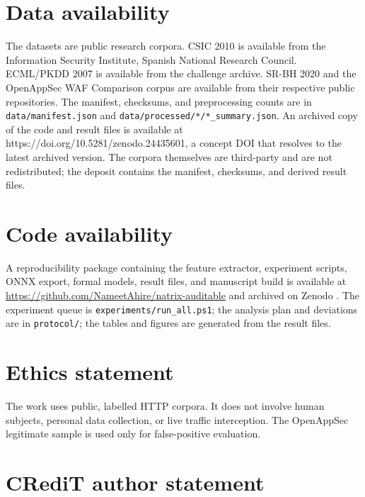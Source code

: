 \documentclass[preprint,11pt]{elsarticle}
\begin{document}
\section*{Data availability}\label{data-availability}

The datasets are public research corpora. CSIC 2010 is available from
the Information Security Institute, Spanish National Research Council.
ECML/PKDD 2007 is available from the challenge archive. SR-BH 2020 and
the OpenAppSec WAF Comparison corpus are available from their respective
public repositories. The manifest, checksums, and preprocessing counts
are in \texttt{data/\allowbreak{}manifest.\allowbreak{}json} and
\texttt{data/\allowbreak{}processed/\allowbreak{}*/\allowbreak{}*\_\allowbreak{}summary.\allowbreak{}json}. An archived copy of the code
and result files is available at
https://doi.org/10.5281/zenodo.24435601, a concept DOI that resolves to
the latest archived version. The corpora themselves are third-party and
are not redistributed; the deposit contains the manifest, checksums, and
derived result files.

\section*{Code availability}\label{code-availability}

A reproducibility package containing the feature extractor, experiment
scripts, ONNX export, formal models, result files, and manuscript build
is available at \url{https://github.com/NameetAhire/natrix-auditable}
and archived on Zenodo \cite{natrix_artifact}. The experiment queue is
\texttt{experiments/\allowbreak{}run\_\allowbreak{}all.\allowbreak{}ps1}; the analysis plan and deviations are
in \texttt{protocol/\allowbreak{}}; the tables and figures are generated from the
result files.

\section*{Ethics statement}\label{ethics-statement}

The work uses public, labelled HTTP corpora. It does not involve human
subjects, personal data collection, or live traffic interception. The
OpenAppSec legitimate sample is used only for false-positive evaluation.

\section*{CRediT author statement}\label{credit-author-statement}
\end{document}
